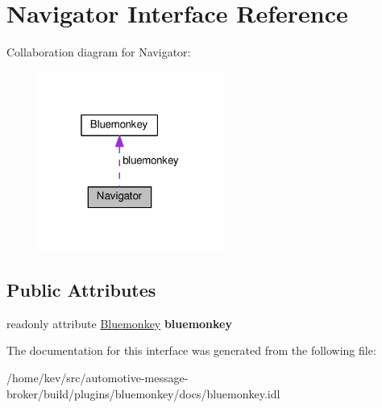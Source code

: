 \hypertarget{interfaceNavigator}{\section{Navigator Interface Reference}
\label{interfaceNavigator}
}


Collaboration diagram for Navigator\+:\nopagebreak
\begin{figure}[H]
\begin{center}
\leavevmode
\includegraphics[width=172pt]{interfaceNavigator__coll__graph}
\end{center}
\end{figure}
\subsection*{Public Attributes}
\begin{DoxyCompactItemize}
\item 
\hypertarget{interfaceNavigator_ac465bddf21aa216b0e4617cbafb0dc26}{readonly attribute \hyperlink{interfaceBluemonkey}{Bluemonkey} {\bfseries bluemonkey}}\label{interfaceNavigator_ac465bddf21aa216b0e4617cbafb0dc26}

\end{DoxyCompactItemize}


The documentation for this interface was generated from the following file\+:\begin{DoxyCompactItemize}
\item 
/home/kev/src/automotive-\/message-\/broker/build/plugins/bluemonkey/docs/bluemonkey.\+idl\end{DoxyCompactItemize}
